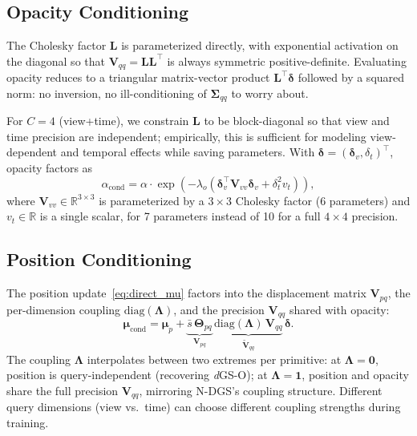\documentclass{article}
\newcommand{\dgso}{\textit{d}GS-O\xspace}
\theoremstyle{plain}
\theoremstyle{definition}
\theoremstyle{remark}
\begin{document}
\subsection{Opacity Conditioning}

The Cholesky factor $\mathbf{L}$ is parameterized directly, with exponential activation on the diagonal so that $\mathbf{V}_{qq}=\mathbf{L}\mathbf{L}^\top$ is always symmetric positive-definite. Evaluating opacity reduces to a triangular matrix-vector product $\mathbf{L}^\top\boldsymbol{\delta}$ followed by a squared norm: no inversion, no ill-conditioning of $\boldsymbol{\Sigma}_{qq}$ to worry about.

For $C=4$ (view+time), we constrain $\mathbf{L}$ to be block-diagonal so that view and time precision are independent; empirically, this is sufficient for modeling view-dependent and temporal effects while saving parameters. With $\boldsymbol{\delta}=(\boldsymbol{\delta}_v,\delta_t)^\top$, opacity factors as
\begin{equation}
\alpha_{\text{cond}} = \alpha \cdot \exp\!\left(-\lambda_o\left(\boldsymbol{\delta}_v^\top \mathbf{V}_{vv} \boldsymbol{\delta}_v + \delta_t^2 v_t\right)\right),
\end{equation}
where $\mathbf{V}_{vv}\in\mathbb{R}^{3\times 3}$ is parameterized by a $3\times 3$ Cholesky factor (6 parameters) and $v_t\in\mathbb{R}$ is a single scalar, for 7 parameters instead of 10 for a full $4\times 4$ precision.

\subsection{Position Conditioning}
\label{subsec:position}

The position update~\eqref{eq:direct_mu} factors into the displacement matrix $\mathbf{V}_{pq}$, the per-dimension coupling $\mathrm{diag}(\boldsymbol{\Lambda})$, and the precision $\mathbf{V}_{qq}$ shared with opacity:
\begin{equation*}
\boldsymbol{\mu}_{\text{cond}} = \boldsymbol{\mu}_p + \underbrace{\bar{s}\,\boldsymbol{\Theta}_{pq}}_{\mathbf{V}_{pq}}\,\underbrace{\mathrm{diag}(\boldsymbol{\Lambda})\,\mathbf{V}_{qq}}_{\tilde{\mathbf{V}}_{qq}}\,\boldsymbol{\delta}.
\end{equation*}
The coupling $\boldsymbol{\Lambda}$ interpolates between two extremes per primitive: at $\boldsymbol{\Lambda}=\mathbf{0}$, position is query-independent (recovering \dgso{}); at $\boldsymbol{\Lambda}=\mathbf{1}$, position and opacity share the full precision $\mathbf{V}_{qq}$, mirroring N-DGS's coupling structure. Different query dimensions (view vs.\ time) can choose different coupling strengths during training.
\end{document}
